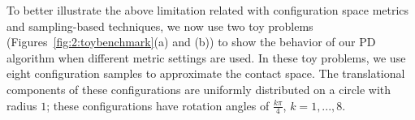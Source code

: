 To better illustrate the above limitation related with configuration space metrics and sampling-based techniques, we now use two toy problems (Figures~\ref{fig:2:toybenchmark}(a) and (b)) to show the behavior of our PD algorithm when different metric settings are used. In these toy problems, we use eight configuration samples to approximate the contact space. The translational components of these configurations are uniformly distributed on a circle with radius $1$; these configurations have rotation angles of $\frac{k \pi}{4}$, $k=1,...,8$.

\begin{figure}[!h]
\centering
   \\

\end{figure}
